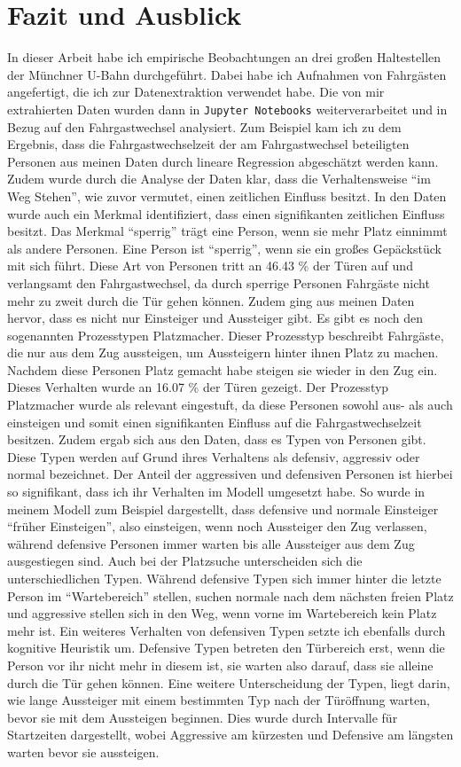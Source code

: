 \chapter{Fazit und Ausblick} \label{Fazit und Ausblick}
In dieser Arbeit habe ich empirische Beobachtungen an drei großen Haltestellen der Münchner U-Bahn durchgeführt. Dabei habe ich Aufnahmen von Fahrgästen angefertigt, die ich zur Datenextraktion verwendet habe. Die von mir extrahierten Daten wurden dann in \texttt{Jupyter Notebooks} weiterverarbeitet und in Bezug auf den Fahrgastwechsel analysiert. Zum Beispiel kam ich zu dem Ergebnis, dass die Fahrgastwechselzeit der am Fahrgastwechsel beteiligten Personen aus meinen Daten durch lineare Regression abgeschätzt werden kann. Zudem wurde durch die Analyse der Daten klar, dass die Verhaltensweise "`im Weg Stehen"', wie zuvor vermutet, einen zeitlichen Einfluss besitzt. In den Daten wurde auch ein Merkmal identifiziert, dass einen signifikanten zeitlichen Einfluss besitzt. Das Merkmal "`sperrig"' trägt eine Person, wenn sie mehr Platz einnimmt als andere Personen. Eine Person ist \zB "`sperrig"', wenn sie ein großes Gepäckstück mit sich führt. Diese Art von Personen tritt an 46.43 \% der Türen auf und verlangsamt den Fahrgastwechsel, da durch sperrige Personen Fahrgäste nicht mehr zu zweit durch die Tür gehen können. Zudem ging aus meinen Daten hervor, dass es nicht nur Einsteiger und Aussteiger gibt. Es gibt es noch den sogenannten Prozesstypen Platzmacher. Dieser Prozesstyp beschreibt Fahrgäste, die nur aus dem Zug aussteigen, um Aussteigern hinter ihnen Platz zu machen. Nachdem diese Personen Platz gemacht habe steigen sie wieder in den Zug ein. Dieses Verhalten wurde an 16.07 \% der Türen gezeigt. Der Prozesstyp Platzmacher wurde als relevant eingestuft, da diese Personen sowohl aus- als auch einsteigen und somit einen signifikanten Einfluss auf die Fahrgastwechselzeit besitzen. Zudem ergab sich aus den Daten, dass es Typen von Personen gibt. Diese Typen werden auf Grund ihres Verhaltens als defensiv, aggressiv oder normal bezeichnet. Der Anteil der aggressiven und defensiven Personen ist hierbei so signifikant, dass ich ihr Verhalten im Modell umgesetzt habe. So wurde in meinem Modell zum Beispiel dargestellt, dass defensive und normale Einsteiger "`früher Einsteigen"', also einsteigen, wenn noch Aussteiger den Zug verlassen, während defensive Personen immer warten bis alle Aussteiger aus dem Zug ausgestiegen sind. Auch bei der Platzsuche unterscheiden sich die unterschiedlichen Typen. Während defensive Typen sich immer hinter die letzte Person im "`Wartebereich"' stellen, suchen normale nach dem nächsten freien Platz und aggressive stellen sich in den Weg, wenn vorne im Wartebereich kein Platz mehr ist. Ein weiteres Verhalten von defensiven Typen setzte ich ebenfalls durch kognitive Heuristik um. Defensive Typen betreten den Türbereich erst, wenn die Person vor ihr nicht mehr in diesem ist, sie warten also darauf, dass sie alleine durch die Tür gehen können. Eine weitere Unterscheidung der Typen, liegt darin, wie lange Aussteiger mit einem bestimmten Typ nach der Türöffnung warten, bevor sie mit dem Aussteigen beginnen. Dies wurde durch Intervalle für Startzeiten dargestellt, wobei Aggressive am kürzesten und Defensive am längsten warten bevor sie aussteigen.

